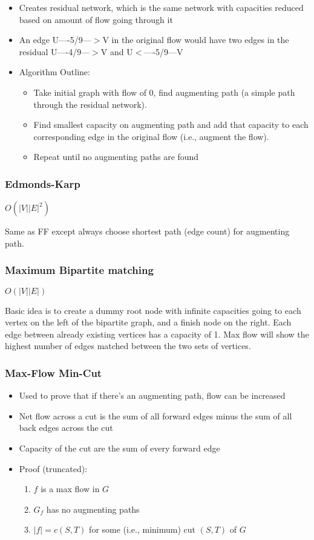 \documentclass[7pt]{article}
\begin{document}
\begin{multicols*}{4}
\begin{itemize}
\item Creates residual network, which is the same network with
  capacities reduced based on amount of flow going through it
\item An edge U----5/9---$>$V in the original flow would have two edges
  in the residual U----4/9---$>$V and U$<$----5/9---V
\item Algorithm Outline:
  \begin{itemize}
  \item Take initial graph with flow of 0, find augmenting path (a
    simple path through the residual network).  
  \item Find smallest capacity on augmenting path and add that
    capacity to each corresponding edge in the original flow (i.e.,
    augment the flow).
  \item Repeat until no augmenting paths are found
  \end{itemize}
\end{itemize}

\subsubsection*{Edmonds-Karp}
$O(|V||E|^2)$

Same as FF except always choose shortest path (edge count) for
augmenting path.

\subsubsection*{Maximum Bipartite matching}
$O(|V||E|)$

Basic idea is to create a dummy root node with infinite capacities
going to each vertex on the left of the bipartite graph, and a finish
node on the right.  Each edge between already existing vertices has a
capacity of 1.  Max flow will show the highest number of edges matched
between the two sets of vertices.  

\subsubsection*{Max-Flow Min-Cut}
\begin{itemize}
\item Used to prove that if there's an augmenting path, flow can be
  increased
\item Net flow across a cut is the sum of all forward edges minus the
  sum of all back edges across the cut
\item Capacity of the cut are the sum of every forward edge
\item Proof (truncated):
  \begin{enumerate}
  \item $f$ is a max flow in $G$
  \item $G_f$ has no augmenting paths
  \item $|f| = c(S,T)$ for some (i.e., minimum) cut $(S,T)$ of $G$
  \end{enumerate}


\end{itemize}
\end{multicols*}
\end{document}
